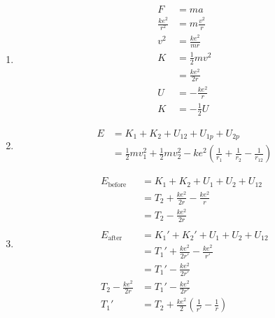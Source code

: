 \documentclass{article}
\begin{document}
\begin{enumerate}
  \item

        \begin{align*}
          F                 & = m a               \\
          \frac{k e^2}{r^2} & = m \frac{v^2}{r}   \\
          v^2               & = \frac{k e^2}{m r} \\
          K                 & = \frac{1}{2} m v^2 \\
                            & = \frac{k e^2}{2 r} \\
          U                 & = -\frac{k e^2}{r}  \\
          K                 & = -\frac{1}{2} U
        \end{align*}

  \item

        \begin{align*}
          E & = K_1 + K_2 + U_{1 2} + U_{1 p} + U_{2 p}                                                                            \\
            & = \frac{1}{2} m v_1^2 + \frac{1}{2} m v_2^2 - k e^2 \left( \frac{1}{r_1} + \frac{1}{r_2} - \frac{1}{r_{1 2}} \right)
        \end{align*}

  \item

        \begin{align*}
          E_\text{before}         & = K_1 + K_2 + U_1 + U_2 + U_{1 2}                                 \\
                                  & = T_2 + \frac{k e^2}{2 r} - \frac{k e^2}{r}                       \\
                                  & = T_2 - \frac{k e^2}{2 r}                                         \\ \\
          E_\text{after}          & = K_1' + K_2' + U_1 + U_2 + U_{1 2}                               \\
                                  & = T_1' + \frac{k e^2}{2 r'} - \frac{k e^2}{r'}                    \\
                                  & = T_1' - \frac{k e^2}{2 r'}                                       \\
          T_2 - \frac{k e^2}{2 r} & = T_1' - \frac{k e^2}{2 r'}                                       \\
          T_1'                    & = T_2 + \frac{k e^2}{2} \left( \frac{1}{r'} - \frac{1}{r} \right)
        \end{align*}
\end{enumerate}
\end{document}
